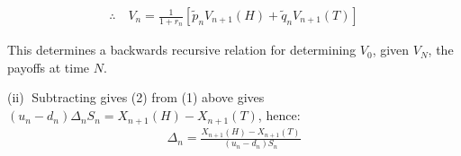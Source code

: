 \documentclass[12pt, letterpaper]{article}
\begin{document}
\begin{gather*}
    \therefore \quad V_n = \frac{1}{1+r_n} \left[ \tilde p_n V_{n+1}(H)+ \tilde q_n V_{n+1}(T)\right]
\end{gather*}

This determines a backwards recursive relation for determining $V_0$, given $V_N$, the payoffs at time $N$.

\rightline{$\square$}

\vspace{5mm}
\noindent
(ii)$\;$
Subtracting gives (2) from (1) above gives $(u_n-d_n)\Delta_n S_n = X_{n+1}(H)- X_{n+1}(T)$, hence:
\begin{gather*}
    \Delta_n = \frac{X_{n+1}(H)- X_{n+1}(T)}{(u_n-d_n)S_n} 
\end{gather*}

\rightline{$\square$}
\end{document}

